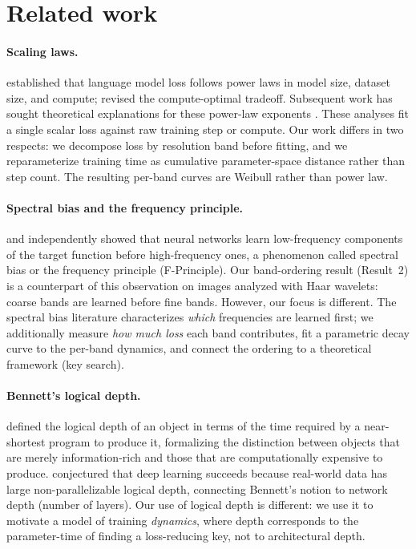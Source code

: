 \documentclass{article}
\begin{document}
\section{Related work}\label{related-work}

\paragraph{Scaling laws.}
\citet{kaplan2020scaling} established that language model loss follows power
laws in model size, dataset size, and compute; \citet{hoffmann2022training}
revised the compute-optimal tradeoff. Subsequent work has sought
theoretical explanations for these power-law exponents
\citep{bahri2024explaining,sharma2022scaling}. These analyses fit a single scalar loss
against raw training step or compute. Our work differs in two respects:
we decompose loss by resolution band before fitting, and we
reparameterize training time as cumulative parameter-space distance
rather than step count. The resulting per-band curves are Weibull rather
than power law.

\paragraph{Spectral bias and the frequency principle.}
\citet{rahaman2019spectral} and \citet{xu2020frequency} independently showed
that neural networks learn low-frequency components of the target
function before high-frequency ones, a phenomenon called spectral bias
or the frequency principle (F-Principle). Our band-ordering result
(Result~2) is a counterpart of this observation on images analyzed with Haar wavelets: coarse
bands are learned before fine bands. However, our focus is different.
The spectral bias literature characterizes \emph{which} frequencies are
learned first; we additionally measure \emph{how much loss} each band
contributes, fit a parametric decay curve to the per-band dynamics, and
connect the ordering to a theoretical framework (key search).

\paragraph{Bennett's logical depth.}
\citet{bennett1988logical} defined the logical depth of an object in
terms of the time required by a near-shortest program to produce it,
formalizing the distinction between
objects that are merely information-rich and those that are
computationally expensive to produce. \citet{hoang2018deep}
conjectured that deep learning succeeds because real-world data has
large non-parallelizable logical depth, connecting Bennett's notion to
network depth (number of layers). Our use of logical depth is different:
we use it to motivate a model of training \emph{dynamics}, where depth
corresponds to the parameter-time of finding a loss-reducing key,
not to architectural depth.
\end{document}
